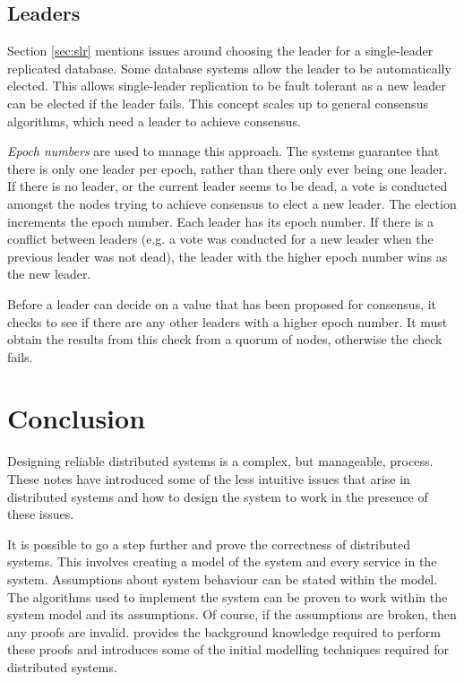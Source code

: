 \subsection{Leaders}

Section \ref{sec:slr} mentions issues around choosing the leader for a single-leader replicated database.
Some database systems allow the leader to be automatically elected.
This allows single-leader replication to be fault tolerant as a new leader can be elected if the leader fails.
This concept scales up to general consensus algorithms, which need a leader to achieve consensus.

\emph{Epoch numbers} are used to manage this approach.
The systems guarantee that there is only one leader per epoch, rather than there only ever being one leader.
If there is no leader, or the current leader seems to be dead,
a vote is conducted amongst the nodes trying to achieve consensus to elect a new leader.
The election increments the epoch number.
Each leader has its epoch number.
If there is a conflict between leaders (e.g. a vote was conducted for a new leader when the previous leader was not dead),
the leader with the higher epoch number wins as the new leader.

Before a leader can decide on a value that has been proposed for consensus,
it checks to see if there are any other leaders with a higher epoch number.
It must obtain the results from this check from a quorum of nodes,
otherwise the check fails.


\section{Conclusion}

Designing reliable distributed systems is a complex, but manageable, process.
These notes have introduced some of the less intuitive issues that arise in distributed systems
and how to design the system to work in the presence of these issues.

It is possible to go a step further and prove the correctness of distributed systems.
This involves creating a model of the system and every service in the system.
Assumptions about system behaviour can be stated within the model.
The algorithms used to implement the system can be proven to work within the system model and its assumptions.
Of course, if the assumptions are broken, then any proofs are invalid.
provides the background knowledge required to perform these proofs
and introduces some of the initial modelling techniques required for distributed systems.